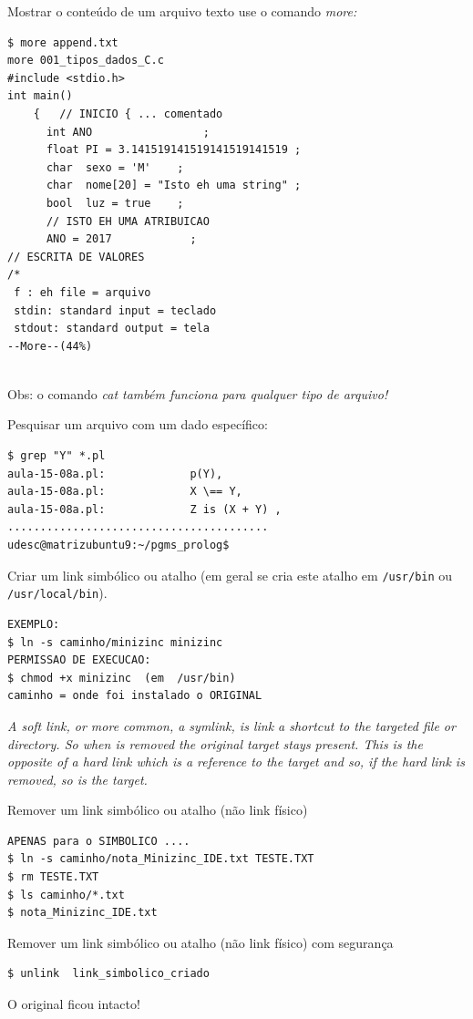 \documentclass[final,a4paper]{article}
\begin{document}
\begin{description}
\begin{verbatim}
\end{verbatim}


\pagebreak
\item[\ding{248}] Mostrar o conteúdo de um arquivo texto use o comando
\em{more}:
\begin{verbatim}
$ more append.txt 
more 001_tipos_dados_C.c 
#include <stdio.h>
int main()
	{   // INICIO { ... comentado
	  int ANO	              ;
	  float PI = 3.141519141519141519141519 ;
	  char  sexo = 'M'    ; 
	  char  nome[20] = "Isto eh uma string" ; 
	  bool  luz = true    ;
	  // ISTO EH UMA ATRIBUICAO
	  ANO = 2017            ;	  
// ESCRITA DE VALORES	  
/*
 f : eh file = arquivo
 stdin: standard input = teclado
 stdout: standard output = tela
--More--(44%)


\end{verbatim}
Obs: o comando \em{cat} também funciona para qualquer tipo de arquivo!

\pagebreak
\item[\ding{248}] Pesquisar um arquivo com um dado específico:
\begin{verbatim}
$ grep "Y" *.pl
aula-15-08a.pl:			    p(Y), 
aula-15-08a.pl:			    X \== Y, 
aula-15-08a.pl:			    Z is (X + Y) ,
........................................
udesc@matrizubuntu9:~/pgms_prolog$ 

\end{verbatim}

\pagebreak
\item[\ding{248}] Criar um link simbólico ou atalho (em geral se cria este atalho em \texttt{/usr/bin} ou \texttt{/usr/local/bin}). 

\begin{verbatim}
EXEMPLO:
$ ln -s caminho/minizinc minizinc
PERMISSAO DE EXECUCAO:
$ chmod +x minizinc  (em  /usr/bin)
caminho = onde foi instalado o ORIGINAL
\end{verbatim}

\emph{A soft link, or more common, a symlink, is link a shortcut to the targeted file or directory. So when is removed the original target stays present. This is the opposite of a hard link which is a reference to the target and so, if the hard link is removed, so is the target.}

\pagebreak
\item[\ding{248}] Remover um link simbólico ou atalho (não link físico)

\begin{verbatim}
APENAS para o SIMBOLICO ....
$ ln -s caminho/nota_Minizinc_IDE.txt TESTE.TXT
$ rm TESTE.TXT 
$ ls caminho/*.txt
$ nota_Minizinc_IDE.txt
\end{verbatim}

\pagebreak
\item[\ding{248}] Remover um link simbólico ou atalho (não link físico)
com segurança
\begin{verbatim}
$ unlink  link_simbolico_criado
\end{verbatim}
O original ficou intacto!

\end{description}
\end{document}
